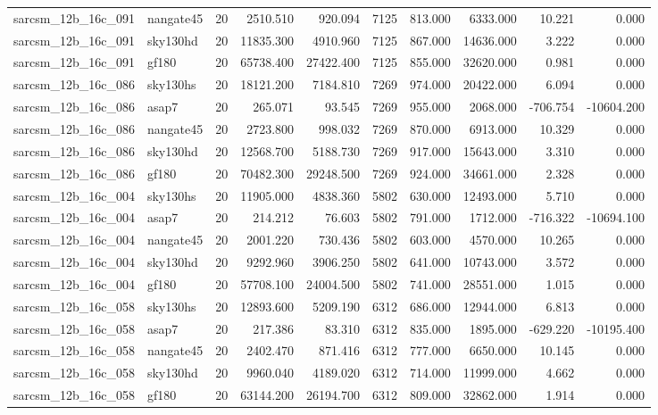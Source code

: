 \begin{tabular}{llrrrrrrrr}
sarcsm\_12b\_16c\_091 & nangate45 & 20 & 2510.510 & 920.094 & 7125 & 813.000 & 6333.000 & 10.221 & 0.000 \\
sarcsm\_12b\_16c\_091 & sky130hd & 20 & 11835.300 & 4910.960 & 7125 & 867.000 & 14636.000 & 3.222 & 0.000 \\
sarcsm\_12b\_16c\_091 & gf180 & 20 & 65738.400 & 27422.400 & 7125 & 855.000 & 32620.000 & 0.981 & 0.000 \\
sarcsm\_12b\_16c\_086 & sky130hs & 20 & 18121.200 & 7184.810 & 7269 & 974.000 & 20422.000 & 6.094 & 0.000 \\
sarcsm\_12b\_16c\_086 & asap7 & 20 & 265.071 & 93.545 & 7269 & 955.000 & 2068.000 & -706.754 & -10604.200 \\
sarcsm\_12b\_16c\_086 & nangate45 & 20 & 2723.800 & 998.032 & 7269 & 870.000 & 6913.000 & 10.329 & 0.000 \\
sarcsm\_12b\_16c\_086 & sky130hd & 20 & 12568.700 & 5188.730 & 7269 & 917.000 & 15643.000 & 3.310 & 0.000 \\
sarcsm\_12b\_16c\_086 & gf180 & 20 & 70482.300 & 29248.500 & 7269 & 924.000 & 34661.000 & 2.328 & 0.000 \\
sarcsm\_12b\_16c\_004 & sky130hs & 20 & 11905.000 & 4838.360 & 5802 & 630.000 & 12493.000 & 5.710 & 0.000 \\
sarcsm\_12b\_16c\_004 & asap7 & 20 & 214.212 & 76.603 & 5802 & 791.000 & 1712.000 & -716.322 & -10694.100 \\
sarcsm\_12b\_16c\_004 & nangate45 & 20 & 2001.220 & 730.436 & 5802 & 603.000 & 4570.000 & 10.265 & 0.000 \\
sarcsm\_12b\_16c\_004 & sky130hd & 20 & 9292.960 & 3906.250 & 5802 & 641.000 & 10743.000 & 3.572 & 0.000 \\
sarcsm\_12b\_16c\_004 & gf180 & 20 & 57708.100 & 24004.500 & 5802 & 741.000 & 28551.000 & 1.015 & 0.000 \\
sarcsm\_12b\_16c\_058 & sky130hs & 20 & 12893.600 & 5209.190 & 6312 & 686.000 & 12944.000 & 6.813 & 0.000 \\
sarcsm\_12b\_16c\_058 & asap7 & 20 & 217.386 & 83.310 & 6312 & 835.000 & 1895.000 & -629.220 & -10195.400 \\
sarcsm\_12b\_16c\_058 & nangate45 & 20 & 2402.470 & 871.416 & 6312 & 777.000 & 6650.000 & 10.145 & 0.000 \\
sarcsm\_12b\_16c\_058 & sky130hd & 20 & 9960.040 & 4189.020 & 6312 & 714.000 & 11999.000 & 4.662 & 0.000 \\
sarcsm\_12b\_16c\_058 & gf180 & 20 & 63144.200 & 26194.700 & 6312 & 809.000 & 32862.000 & 1.914 & 0.000 \\

\end{tabular}
